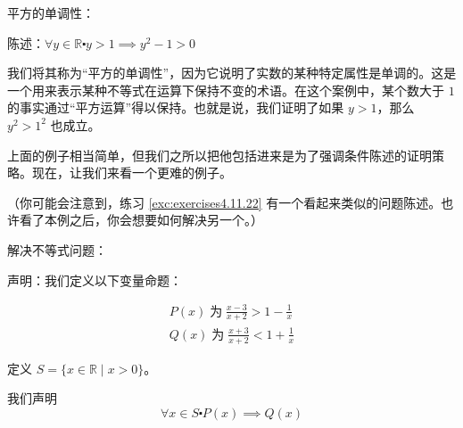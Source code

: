 \begin{example}
    平方的单调性：

    \begin{center}
        陈述：$\forall y \in \mathbb{R} \centerdot y>1 \implies y^2-1>0$
    \end{center}
\end{example}

\begin{center}
    \noindent {}
\end{center}

我们将其称为``平方的单调性''，因为它说明了实数的某种特定属性是单调的。这是一个用来表示某种不等式在运算下保持不变的术语。在这个案例中，某个数大于 $1$ 的事实通过``平方运算''得以保持。也就是说，我们证明了如果 $y > 1$，那么 $y^2 > 1^2$ 也成立。

上面的例子相当简单，但我们之所以把他包括进来是为了强调条件陈述的证明策略。现在，让我们来看一个更难的例子。

（你可能会注意到，练习 \ref{exc:exercises4.11.22} 有一个看起来类似的问题陈述。也许看了本例之后，你会想要如何解决另一个。）

\begin{example}\label{ex:example4.9.8}
    解决不等式问题：

    声明：我们定义以下变量命题：

    \begin{align*}
        P(x) \;\text{为}\; \frac{x-3}{x+2}>1-\frac{1}{x} \\
        Q(x) \;\text{为}\; \frac{x+3}{x+2}<1+\frac{1}{x}
    \end{align*}

    定义 $S = \{x \in \mathbb{R} \mid x > 0\}$。

    我们声明
    \[\forall x \in S \centerdot P(x) \implies Q(x)\]
\end{example}

